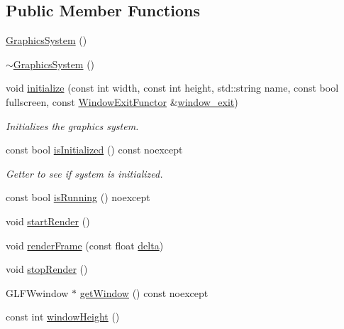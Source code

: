 \subsection*{Public Member Functions}
\begin{DoxyCompactItemize}
\item 
\hyperlink{class_graphics_1_1_graphics_system_a748459586ae5ea2aa8721dddb8660de6}{Graphics\+System} ()
\item 
\hyperlink{class_graphics_1_1_graphics_system_a6504df337bfae3a08abc8a63deb6df37}{$\sim$\+Graphics\+System} ()
\item 
void \hyperlink{class_graphics_1_1_graphics_system_a2e43bd2dfdcf734f331d2edb060c2e3e}{initialize} (const int width, const int height, std\+::string name, const bool fullscreen, const \hyperlink{class_graphics_1_1_window_exit_functor}{Window\+Exit\+Functor} \&\hyperlink{class_graphics_1_1_graphics_system_ac31d552052e7afd10043456ee9393e1a}{window\+\_\+exit})
\begin{DoxyCompactList}\small\item\em Initializes the graphics system. \end{DoxyCompactList}\item 
const bool \hyperlink{class_graphics_1_1_graphics_system_a1bd027633e66df5a65f2df33952d1dbd}{is\+Initialized} () const noexcept
\begin{DoxyCompactList}\small\item\em Getter to see if system is initialized. \end{DoxyCompactList}\item 
const bool \hyperlink{class_graphics_1_1_graphics_system_a025aee61ac5bee34790c70cee97bac70}{is\+Running} () noexcept
\item 
void \hyperlink{class_graphics_1_1_graphics_system_ac556ec7a6814de00a4a139f4fe77c90f}{start\+Render} ()
\item 
void \hyperlink{class_graphics_1_1_graphics_system_ab7ce838a5cbca90503b8987a4968417d}{render\+Frame} (const float \hyperlink{class_graphics_1_1_graphics_system_ac2af4e3929076d67c1ac1a891a42d29f}{delta})
\item 
void \hyperlink{class_graphics_1_1_graphics_system_ab4a3487deb44f621a78c25d4922fa54b}{stop\+Render} ()
\item 
G\+L\+F\+Wwindow $\ast$ \hyperlink{class_graphics_1_1_graphics_system_a21c7c51da977ac170844b4858afc9e21}{get\+Window} () const noexcept
\item 
const int \hyperlink{class_graphics_1_1_graphics_system_a09710fc777ac4db1b44c63c2921d217f}{window\+Height} ()

\end{DoxyCompactItemize}
